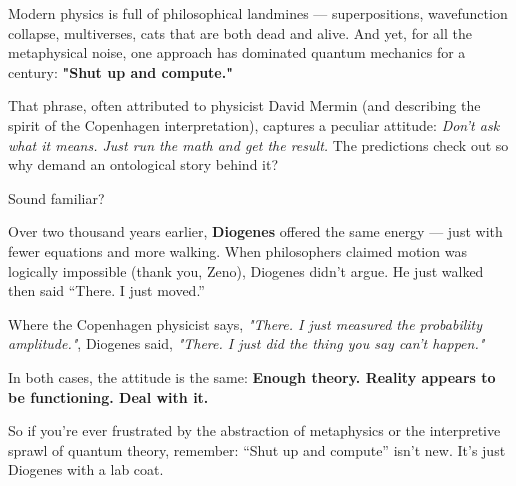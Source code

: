 \begin{tcolorbox}[title=Historical Sidebar: Diogenes reincarnated as ``Shut up and Compute'', colback=gray!5, colframe=black, fonttitle=\bfseries]

  Modern physics is full of philosophical landmines — superpositions, wavefunction collapse, multiverses, cats that are both dead and alive. And yet, for all the metaphysical noise, one approach has dominated quantum mechanics for a century: \textbf{"Shut up and compute."}

  \medskip
  
  That phrase, often attributed to physicist David Mermin (and describing the spirit of the Copenhagen interpretation), captures a peculiar attitude: \emph{Don’t ask what it means. Just run the math and get the result.} The predictions check out so why demand an ontological story behind it?

  \medskip
  
  Sound familiar?

  \medskip
  
  Over two thousand years earlier, \textbf{Diogenes} offered the same energy — just with fewer equations and more walking. When philosophers claimed motion was logically impossible (thank you, Zeno), Diogenes didn’t argue. He just walked then said ``There. I just moved.''

  \medskip
  
  Where the Copenhagen physicist says, \textit{"There. I just measured the probability amplitude."}, Diogenes said, \textit{"There. I just did the thing you say can't happen."}

  \medskip
  
  In both cases, the attitude is the same:  \textbf{Enough theory. Reality appears to be functioning. Deal with it.}

  \medskip
  
  So if you're ever frustrated by the abstraction of metaphysics or the interpretive sprawl of quantum theory, remember: ``Shut up and compute'' isn’t new. It's just Diogenes with a lab coat.
  
\end{tcolorbox}
  



